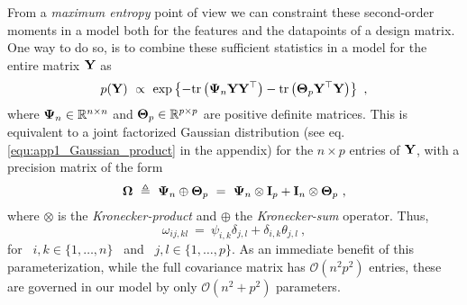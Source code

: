     From a \emph{maximum entropy} point of view we can constraint these second-order moments in a model both for the features and the datapoints of a design matrix.
    One way to do so, is to combine these sufficient statistics in a model for the entire matrix $\mathbf{Y}$ as
    \begin{equation*}
      p(\mathbf{Y}) ~ \propto ~ \textrm{exp}\left\{  -\textrm{tr} \left( \mathbf{\Psi}_n \mathbf{Y}\mathbf{Y}^\top \right) -\textrm{tr} \left( \mathbf{\Theta}_p \mathbf{Y}^\top\mathbf{Y} \right) \right\} ~,
    \end{equation*}
    where $\mathbf{\Psi}_n \in \mathbb{R}^{n \times n}$ and $\mathbf{\Theta}_p \in \mathbb{R}^{p \times p}$ are positive definite matrices.
    This is equivalent to a joint factorized Gaussian distribution
    (see eq. \eqref{equ:app1_Gaussian_product} in the appendix)
    for the $n \times p$ entries of $\mathbf{Y}$, with a precision matrix of the form
    \begin{equation*}
      \mathbf{\Omega} ~\triangleq~ \mathbf{\Psi}_n \oplus \mathbf{\Theta}_p ~=~ \mathbf{\Psi}_n \otimes \mathbf{I}_p + \mathbf{I}_n \otimes \mathbf{\Theta}_p ~,
    \end{equation*}
    where $\otimes$ is the \emph{Kronecker-product} and $\oplus$ the \emph{Kronecker-sum} operator.
    Thus,
    \begin{equation*}
      \omega_{ij, kl} ~=~ \psi_{i,k} \delta_{j,l} + \delta_{i,k} \theta_{j,l} ~,
    \end{equation*}
    for ~$i,k \in \{1,\dots,n\}$~ and ~$j, l \in \{1,\dots,p\}$.
    As an immediate benefit of this parameterization, while the full covariance matrix has $\mathcal{O}(n^2 p^2)$ entries, these are governed in our model by only $\mathcal{O}(n^2 + p^2)$ parameters.
    

